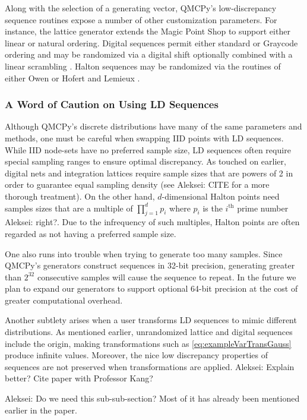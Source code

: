 \documentclass[graybox,footinfo]{svmult}
\newcommand{\AGSComment}[1]{{\color{cyan} Aleksei: #1}}
\begin{document}
Along with the selection of a generating vector, QMCPy's low-discrepancy sequence routines expose a number of other customization parameters. For instance, the lattice generator extends the Magic Point Shop \cite{Nuy17a} to support either linear or natural ordering. Digital sequences permit either standard or Graycode ordering and may be randomized via a digital shift optionally combined with a linear scrambling \cite{Mat98}. Halton sequences may be randomized via the routines of either Owen \cite{Owe20a} or Hofert and Lemieux \cite{QRNG2020}. 
\subsubsection{A Word of Caution on Using LD Sequences}

Although QMCPy's discrete distributions have many of the same parameters and methods, one must be careful when swapping IID points with LD sequences. While IID node-sets have no preferred sample size, LD sequences often require special sampling ranges to ensure optimal discrepancy. As touched on earlier, digital nets and integration lattices require sample sizes that are powers of 2 in order to guarantee equal sampling density (see \AGSComment{CITE} for a more thorough treatment). On the other hand, $d$-dimensional Halton points need samples sizes that are a multiple of $\prod_{j=1}^d p_i$ where $p_i$ is the $i^{\text{th}}$ prime number \AGSComment{right?}. Due to the infrequency of such multiples, Halton points are often regarded as not having a preferred sample size.  

One also runs into trouble when trying to generate too many samples. Since QMCPy's generators construct sequences in 32-bit precision, generating greater than $2^{32}$ consecutive samples will cause the sequence to repeat. In the future we plan to expand our generators to support optional 64-bit precision at the cost of greater computational overhead.

Another subtlety arises when a user transforms LD sequences to mimic different distributions. As mentioned earlier, unrandomized lattice and digital sequences include the origin, making transformations such as \eqref{eq:exampleVarTransGauss} produce infinite values. Moreover, the nice low discrepancy properties of sequences are not preserved when transformations are applied. \AGSComment{Explain better? Cite paper with Professor Kang?}

\AGSComment{Do we need this sub-sub-section? Most of it has already been mentioned earlier in the paper.}
\end{document}
